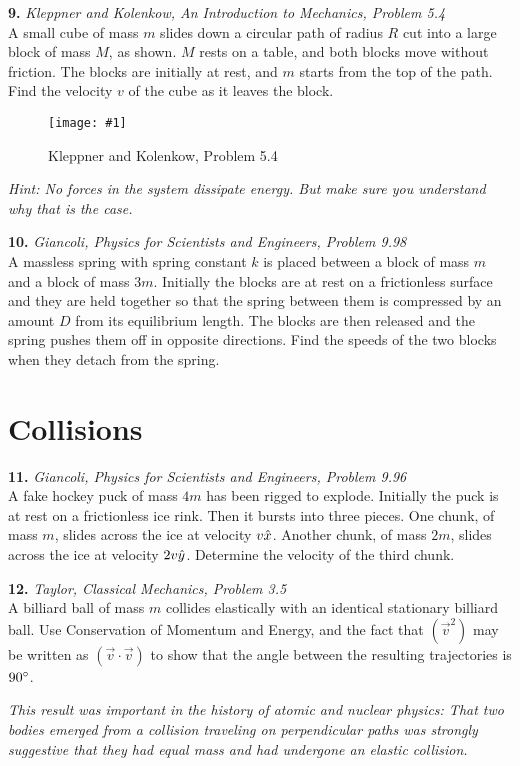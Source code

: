 \documentclass[11pt]{article}
\newcommand{\fig}[4]{
    \begin{figure}[H]
        \centering
        \texttt{[image: \#1]}
        \caption{#2}
        \label{exp4fit}
    \end{figure}
}
\theoremstyle{gangnamstyle}{\newtheorem{definition}{Definition}[]}
\theoremstyle{gangnamstyle}{\newtheorem{example}{Example}[]}
\theoremstyle{gangnamstyle}{\newtheorem{problem}{Problem}[]}
\begin{document}
\pagebreak

\textbf{9.} \textit{Kleppner and Kolenkow, An Introduction to Mechanics, Problem 5.4} \\
A small cube of mass $m$ slides down a circular path of radius $R$ cut into a large block of mass $M$, as shown. $M$ rests on a table, and both blocks move without friction. The blocks are initially at rest, and $m$ starts from the top of the path. Find the velocity $v$ of the cube as it leaves the block.
\fig{figs/0715/kk54.png}{Kleppner and Kolenkow, Problem 5.4}{0.6}{0}
\textit{Hint: No forces in the system dissipate energy. But make sure you understand why that is the case.}

\pagebreak

\textbf{10.} \textit{Giancoli, Physics for Scientists and Engineers, Problem 9.98} \\
A massless spring with spring constant $k$ is placed between a block of mass $m$ and a block of mass $3m$. Initially the blocks are at rest on a frictionless surface and they are held together so that the spring between them is compressed by an amount $D$ from its equilibrium length. The blocks are then released and the spring pushes them off in opposite directions. Find the speeds of the two blocks when they detach from the spring.

\pagebreak

\section{Collisions}

\textbf{11.} \textit{Giancoli, Physics for Scientists and Engineers, Problem 9.96} \\
A fake hockey puck of mass $4m$ has been rigged to explode. Initially the puck is at rest on a frictionless ice rink. Then it bursts into three pieces. One chunk, of mass $m$, slides across the ice at velocity $v\Hat{x}$. Another chunk, of mass $2m$, slides across the ice at velocity $2v \Hat{y}$. Determine the velocity of the third chunk. 

\pagebreak

\textbf{12.} \textit{Taylor, Classical Mechanics, Problem 3.5} \\
A billiard ball of mass $m$ collides elastically with an identical stationary billiard ball. Use Conservation of Momentum and Energy, and the fact that $(\Vec{v}^2)$ may be written as $(\Vec{v} \cdot \Vec{v})$ to show that the angle between the resulting trajectories is $90 \degree$.

\textit{This result was important in the history of atomic and nuclear physics: That two bodies emerged from a collision traveling on perpendicular paths was strongly suggestive that they had equal mass and had undergone an elastic collision.}

\pagebreak
\end{document}
